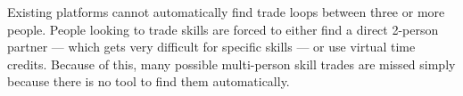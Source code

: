 Existing platforms cannot automatically find trade loops between three or more people. People looking to trade skills are forced to either find a direct 2-person partner --- which gets very difficult for specific skills --- or use virtual time credits. Because of this, many possible multi-person skill trades are missed simply because there is no tool to find them automatically.
